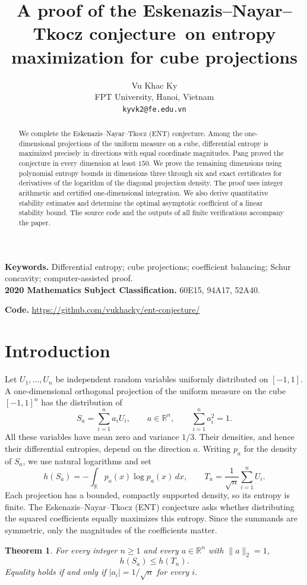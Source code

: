 \documentclass[11pt,a4paper]{article}
\title{A proof of the Eskenazis--Nayar--Tkocz conjecture\ on entropy maximization for cube projections}
\author{Vu Khac Ky\\\small FPT University, Hanoi, Vietnam\\\small\texttt{kyvk2@fe.edu.vn}}
\date{}
\newtheorem{theorem}{Theorem}[section]
\theoremstyle{remark}\newtheorem{remark}[theorem]{Remark}
\newcommand{\R}{\mathbb R}
\begin{document}
\maketitle
\begin{abstract}
We complete the Eskenazis--Nayar--Tkocz (ENT) conjecture. Among the
one-dimensional projections of the uniform measure on a cube, differential
entropy is maximized precisely in directions with equal coordinate
magnitudes. Pang proved the conjecture in every dimension at least $150$.
We prove the remaining dimensions using polynomial entropy bounds in
dimensions three through six and exact certificates for derivatives of
the logarithm of the diagonal projection density. The proof uses integer
arithmetic and certified one-dimensional integration. We also derive
quantitative stability estimates and determine the optimal asymptotic
coefficient of a linear stability bound. The source code and the outputs
of all finite verifications accompany the paper.
\end{abstract}
\noindent\textbf{Keywords.} Differential entropy; cube projections; coefficient balancing;
Schur concavity; computer-assisted proof.\\
\textbf{2020 Mathematics Subject Classification.} 60E15, 94A17, 52A40.
\par\smallskip
\noindent\textbf{Code.} \url{https://github.com/vukhacky/ent-conjecture/}

\section{Introduction}
Let $U_1,\ldots,U_n$ be independent random variables uniformly distributed
on $[-1,1]$. A one-dimensional orthogonal projection of the uniform
measure on the cube $[-1,1]^n$ has the distribution of
\[
 S_a=\sum_{i=1}^n a_iU_i,\qquad a\in\R^n,\qquad \sum_{i=1}^na_i^2=1.
\]
All these variables have mean zero and variance $1/3$. Their densities,
and hence their differential entropies, depend on the direction $a$.
Writing $p_a$ for the density of $S_a$, we use natural logarithms and set
\[
 h(S_a)=-\int_{\R}p_a(x)\log p_a(x)\,dx,
 \qquad T_n=\frac1{\sqrt n}\sum_{i=1}^n U_i.
\]
Each projection has a bounded, compactly supported density, so its entropy
is finite. The Eskenazis--Nayar--Tkocz (ENT) conjecture asks whether
distributing the squared coefficients equally maximizes this entropy.
Since the summands are symmetric, only the magnitudes of the
coefficients matter.

\begin{theorem}\label{thm:main}
For every integer $n\ge1$ and every $a\in\R^n$ with $\|a\|_2=1$,
\begin{equation}\label{eq:main}
 h(S_a)\le h(T_n).
\end{equation}
Equality holds if and only if $|a_i|=1/\sqrt n$ for every $i$.
\end{theorem}
\end{document}
